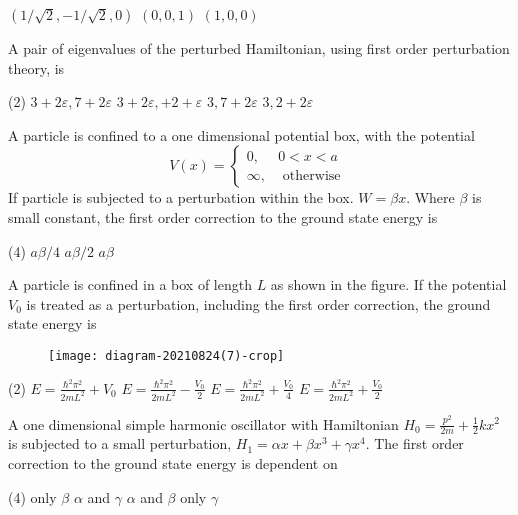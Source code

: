 \begin{enumerate}
\begin{tasks}
	\task[\textbf{B.}]$(1 / \sqrt{2},-1 / \sqrt{2}, 0)$
	\task[\textbf{C.}] $(0,0,1)$
	\task[\textbf{D.}]$(1,0,0)$
\end{tasks}
\begin{minipage}{\textwidth}
	\item A pair of eigenvalues of the perturbed Hamiltonian, using first order perturbation theory, is
\end{minipage}
\begin{tasks}(2)
	\task[\textbf{A.}]$3+2 \varepsilon, 7+2 \varepsilon$
	\task[\textbf{B.}]$3+2 \varepsilon,+2+\varepsilon$
	\task[\textbf{C.}]$3,7+2 \varepsilon$
	\task[\textbf{D.}]$3,2+2 \varepsilon$
\end{tasks}
\begin{minipage}{\textwidth}
	\item A particle is confined to a one dimensional potential box, with the potential
	$$
	V(x)= \begin{cases}0, & 0<x<a \\ \infty, & \text { otherwise }\end{cases}
	$$
	If particle is subjected to a perturbation within the box. $W=\beta x$. Where $\beta$ is small constant, the first order correction to the ground state energy is
\end{minipage}
\begin{tasks}(4)
	\task[\textbf{B.}]$a \beta / 4$
	\task[\textbf{C.}]$a \beta / 2$
	\task[\textbf{D.}] $a \beta$
\end{tasks}
\begin{minipage}{\textwidth}
	\item A particle is confined in a box of length $L$ as shown in the figure. If the potential $V_{0}$ is treated as a perturbation, including the first order correction, the ground state energy is
	\begin{figure}[H]
		\centering
		\texttt{[image: diagram-20210824(7)-crop]}
	\end{figure}
\end{minipage}
\begin{tasks}(2)
	\task[\textbf{A.}] $E=\frac{\hbar^{2} \pi^{2}}{2 m L^{2}}+V_{0}$
	\task[\textbf{B.}]$E=\frac{\hbar^{2} \pi^{2}}{2 m L^{2}}-\frac{V_{0}}{2}$
	\task[\textbf{C.}] $E=\frac{\hbar^{2} \pi^{2}}{2 m L^{2}}+\frac{V_{0}}{4}$
	\task[\textbf{D.}]$E=\frac{\hbar^{2} \pi^{2}}{2 m L^{2}}+\frac{V_{0}}{2}$
\end{tasks}
\begin{minipage}{\textwidth}
	\item A one dimensional simple harmonic oscillator with Hamiltonian $H_{0}=\frac{p^{2}}{2 m}+\frac{1}{2} k x^{2}$ is subjected to a small perturbation, $H_{1}=\alpha x+\beta x^{3}+\gamma x^{4}$. The first order correction to the ground state energy is dependent on
\end{minipage}
\begin{tasks}(4)
	\task[\textbf{A.}] only $\beta$
	\task[\textbf{B.}]$\alpha$ and $\gamma$
	\task[\textbf{C.}]$\alpha$ and $\beta$
	\task[\textbf{D.}]only $\gamma$
\end{tasks}
  \end{enumerate}
